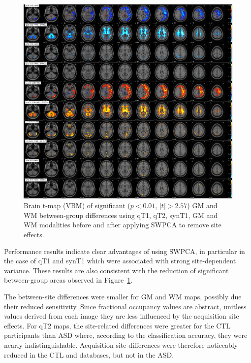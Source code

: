 \begin{figure}
	\centering
	\includegraphics[width=\linewidth]{Graphics/ch7/FIGURE03}
	\caption[Brain t-map (\acs{VBM}) of significant ($p<0.01$, $|t|>2.57$) \acs{GM} and \acs{WM} between-group differences using \acs{qT1}, \acs{qT2}, \acs{synT1}, \acs{GM} and \acs{WM} modalities after applying \acs{SWPCA} to remove site effects.]{Brain t-map (\ac{VBM}) of significant ($p<0.01$, $|t|>2.57$) \ac{GM} and \ac{WM} between-group differences using \ac{qT1}, \ac{qT2}, \ac{synT1}, \ac{GM} and \ac{WM} modalities before and after applying \ac{SWPCA} to remove site effects.}
	\label{fig:swpcaFIGURE03}
\end{figure}

Performance results indicate clear advantages of using \ac{SWPCA}, in particular in the case of \ac{qT1} and \ac{synT1} which were associated with strong site-dependent variance. These results are also consistent with the reduction of significant between-group areas observed in Figure~\ref{fig:swpcaFIGURE03}.
	
The between-site differences were smaller for \ac{GM} and \ac{WM} maps, possibly due their reduced sensitivity. Since fractional occupancy values are abstract, unitless values derived from each image they are less influenced by the acquisition site effects. For \ac{qT2} maps, the site-related differences were greater for the \ac{CTL} participants than \ac{ASD} where, according to the classification accuracy, they were nearly indistinguishable. Acquisition site differences were therefore noticeably reduced in the \ac{CTL} and \all{} databases, but not in the \ac{ASD}.

